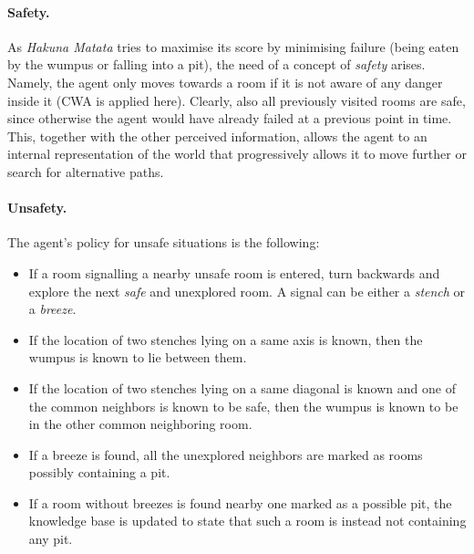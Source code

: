 \documentclass{llncs}
\newcommand{\hm}{\emph{Hakuna Matata}\xspace}
\begin{document}

\paragraph{Safety.} As \hm tries to maximise its score by minimising failure (being eaten by the wumpus or falling into a pit), the need of a concept of \emph{safety} arises.
Namely, the agent only moves towards a room if it is not aware of any danger inside it (CWA is applied here).
Clearly, also all previously visited rooms are safe, since otherwise the agent would have already failed at a previous point in time.
This, together with the other perceived information, allows the agent to  an internal representation of the world that progressively allows it to move further or search for alternative paths.

\paragraph{Unsafety.} The agent's policy for unsafe situations is the following:
\begin{itemize}
	\item If a room signalling a nearby unsafe room is entered, turn backwards and explore the next \emph{safe} and unexplored room. A signal can be either a \emph{stench} or a \emph{breeze}.
	\item If the location of two stenches lying on a same axis is known, then the wumpus is known to lie between them.
	\item If the location of two stenches lying on a same diagonal is known and one of the common neighbors is known to be safe, then the wumpus is known to be in the other common neighboring room.
	\item If a breeze is found, all the unexplored neighbors are marked as rooms possibly containing a pit.
	\item If a room without breezes is found nearby one marked as a possible pit, the knowledge base is updated to state that such a room is instead not containing any pit.
\end{itemize}
\end{document}
